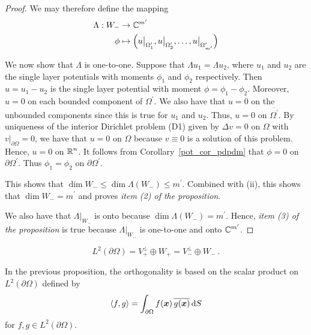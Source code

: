 \begin{proof}
We may therefore define the mapping
\begin{align*}
\Lambda : W_- & \rightarrow \mathbb{C}^{m^{\prime}} \\
\phi &\mapsto \left( u\big|_{\Omega^{\prime}_1}, u\big|_{\Omega^{\prime}_2},
\ldots, u\big|_{\Omega^{\prime}_{m^{\prime}}}\right)
\end{align*}

We now show that $\Lambda$ is one-to-one.  Suppose that
$\Lambda u_1 = \Lambda u_2$, where $u_1$ and $u_2$ are the single
layer potentials with moments $\phi_1$ and $\phi_2$ respectively.
Then $u=u_1-u_2$ is the single layer potential with moment
$\phi = \phi_1-\phi_2$.  Moreover, $u = 0$ on each bounded component of
$\displaystyle \Omega^{\prime}$.  We also have that $u = 0$ on the unbounded
components since this is true for $u_1$ and $u_2$.   Thus,
$u=0$ on $\displaystyle \overline{\Omega^{\prime}}$.
By uniqueness of the interior Dirichlet problem (D1) given by
$\Delta v =0$ on $\Omega$ with $\displaystyle v\big|_{\partial \Omega}=0$,
we have that $u=0$ on $\Omega$ because $v\equiv 0$ is a solution of this
problem.   Hence, $u = 0$ on $\displaystyle \mathbb{R}^n$.  It follows from
Corollary~\ref{pot_cor_pdpdm} that $\phi =0$ on
$\displaystyle \partial \Omega^{\prime}$.
Thus $\phi_1=\phi_2$ on $\displaystyle \partial \Omega^{\prime}$.

This shows that
$\displaystyle \dim W_- \leq \dim \Lambda(W_-) \leq m^{\prime}$.  Combined
with (ii), this shows that $\displaystyle \dim W_- = m^{\prime}$ and proves
{\em item (2) of the proposition}.

We also have that $\displaystyle \Lambda\big|_{W_-}$ is onto because
$\dim \Lambda(W_-) = m^{\prime}$.  Hence, 
{\em item (3) of the proposition} is true because
$\displaystyle \Lambda\big|_{W_-}$ is one-to-one and onto
$\displaystyle \mathbb{C}^{m^{\prime}}$.
\end{proof}

\begin{prop} \label{pot_L2_split1}
\[
L^2(\partial \Omega) = V_+^\perp \oplus W_+ = V_-^\perp \oplus W_- \ .
\]
\end{prop}

In the previous proposition, the orthogonality is based on the scalar
product on $\displaystyle L^2(\partial \Omega)$ defined by
\[
\left\langle{f} , {g}\right\rangle = \int_{\partial \Omega} f({\bm{x}})\,\overline{g({\bm{x}})} \,\mathrm{d}{S}
\]
for $\displaystyle f,g \in L^2(\partial \Omega)$.

